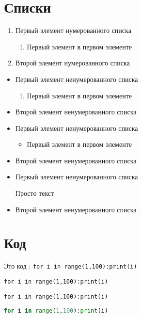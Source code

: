 \section{\textbf{Списки}}
\begin{enumerate}

\item Первый элемент нумерованного списка
\begin{enumerate}

\item Первый элемент в первом элементе

\end{enumerate}
\item Второй элемент нумерованного списка

\end{enumerate}
\begin{itemize}

\item Первый элемент ненумерованного списка
\begin{enumerate}

\item Первый элемент в первом элементе

\end{enumerate}
\item Второй элемент ненумерованного списка
\item Первый элемент ненумерованного списка
\begin{itemize}

\item Первый элемент в первом элементе

\end{itemize}
\item Второй элемент ненумерованного списка
\item Первый элемент ненумерованного списка

Просто текст
\item Второй элемент ненумерованного списка

\end{itemize}
\section{\textbf{Код}}

Это код : \texttt{for i in range(1,100):print(i)}
\begin{lstlisting}
for i in range(1,100):print(i)
\end{lstlisting}
\begin{lstlisting}
for i in range(1,100):print(i)
\end{lstlisting}
\begin{lstlisting}[language = python]
for i in range(1,100):print(i)
\end{lstlisting}
